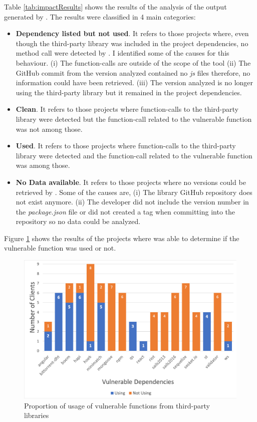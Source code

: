 Table \ref{tab:impactResults} shows the results of the analysis of the output generated by \tool[]. The results were classified in 4 main categories:
\begin{itemize}
    \item \textbf{Dependency listed but not used}. It refers to those projects where, even though the third-party library was included in the project dependencies, no method call were detected by \tool[]. I identified some of the causes for this behaviour. (i) The function-calls are outside of the scope of the tool (ii) The GitHub commit from the version analyzed contained no \textit{js} files therefore, no information could have been retrieved. (iii) The version analyzed is no longer using the third-party library but it remained in the project dependencies. 
    
    \item \textbf{Clean}. It refers to those projects where function-calls to the third-party library were detected but the function-call related to the vulnerable function was not among those.
    
    \item \textbf{Used}. It refers to those projects where function-calls to the third-party library were detected and the function-call related to the vulnerable function was among those.
    
    \item \textbf{No Data available}. It refers to those projects where no versions could be retrieved by \tool[]. Some of the causes are, (i) The library GitHub repository does not exist anymore. (ii) The developer did not include the version number in the \textit{package.json} file or did not created a tag when committing into the repository so no data could be analyzed. 
\end{itemize}

Figure \ref{fig:impactResults} shows the results of the projects where \tool[] was able to determine if the vulnerable function was used or not.

\begin{figure}[ht]
\centering
\includegraphics[width=1\textwidth]{images/impact_results.png}
\caption{Proportion of usage of vulnerable functions from third-party libraries}
\label{fig:impactResults}
\end{figure}

